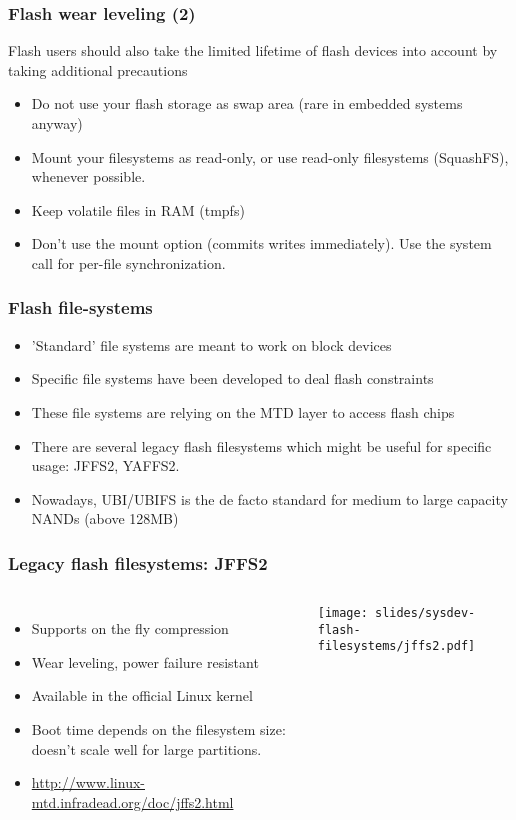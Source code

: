 \begin{frame}
  \frametitle{Flash wear leveling (2)}
  Flash users should also take the limited lifetime of flash
  devices into account by taking additional precautions
  \begin{itemize}
  \item Do not use your flash storage as swap area (rare in embedded
    systems anyway)
  \item Mount your filesystems as read-only, or use read-only
    filesystems (SquashFS), whenever possible.
  \item Keep volatile files in RAM (tmpfs)
  \item Don't use the  mount option (commits writes
    immediately). Use the  system call for per-file
    synchronization.
  \end{itemize}
\end{frame}

\begin{frame}
  \frametitle{Flash file-systems}
  \begin{itemize}
  \item 'Standard' file systems are meant to work on block devices
  \item Specific file systems have been developed to deal flash
    constraints
  \item These file systems are relying on the MTD layer to access
    flash chips
  \item There are several legacy flash filesystems which might be
    useful for specific usage: JFFS2, YAFFS2.
  \item Nowadays, UBI/UBIFS is the de facto standard for medium to
    large capacity NANDs (above 128MB)
  \end{itemize}
\end{frame}

\begin{frame}
  \frametitle{Legacy flash filesystems: JFFS2}
  \begin{columns}
    \begin{itemize}
    \item Supports on the fly compression
    \item Wear leveling, power failure resistant
    \item Available in the official Linux kernel
    \item Boot time depends on the filesystem size: doesn't scale well
      for large partitions.
    \item \url{http://www.linux-mtd.infradead.org/doc/jffs2.html}
    \end{itemize}
    \texttt{[image: slides/sysdev-flash-filesystems/jffs2.pdf]}
  \end{columns}
\end{frame}

